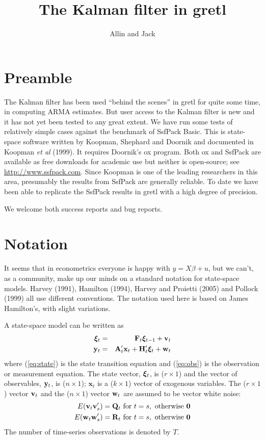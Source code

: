 \documentclass[a4paper]{article}
\title{The Kalman filter in gretl}
\author{Allin and Jack}
\newcommand{\obsvec}{\ensuremath\mathbf{y}}
\newcommand{\obsmat}{\ensuremath\mathbf{H}}
\newcommand{\obsx}{\ensuremath\mathbf{x}}
\newcommand{\obsxmat}{\ensuremath\mathbf{A}}
\newcommand{\obsdist}{\ensuremath\mathbf{w}}
\newcommand{\obsvar}{\ensuremath\mathbf{R}}
\newcommand{\statevec}{\ensuremath\mathbf{\bm \xi}}
\newcommand{\statemat}{\ensuremath\mathbf{F}}
\newcommand{\strdist}{\ensuremath\mathbf{v}}
\newcommand{\strvar}{\ensuremath\mathbf{Q}}
\begin{document}
\maketitle

\section{Preamble}
\label{sec:amble}

The Kalman filter has been used ``behind the scenes'' in gretl for
quite some time, in computing ARMA estimates.  But user access to the
Kalman filter is new and it has not yet been tested to any great
extent.  We have run some tests of relatively simple cases against the
benchmark of \textsf{SsfPack Basic}.  This is state-space software
written by Koopman, Shephard and Doornik and documented in Koopman
\textit{et al} (1999).  It requires Doornik's \textsf{ox} program.
Both \textsf{ox} and \textsf{SsfPack} are available as free downloads
for academic use but neither is open-source; see
\url{http://www.ssfpack.com}.  Since Koopman is one of the leading
researchers in this area, presumably the results from \textsf{SsfPack}
are generally reliable.  To date we have been able to replicate the
\textsf{SsfPack} results in gretl with a high degree of precision.

We welcome both success reports and bug reports.

\section{Notation}

It seems that in econometrics everyone is happy with $y = X \beta +
u$, but we can't, as a community, make up our minds on a standard
notation for state-space models. Harvey (1991), Hamilton (1994),
Harvey and Proietti (2005) and Pollock (1999) all use different
conventions. The notation used here is based on James Hamilton's, with
slight variations.

A state-space model can be written as
\begin{eqnarray}
  \label{eq:state}
  \statevec_{t} & = & \statemat_{t} \statevec_{t-1} + \strdist_t \\
  \label{eq:obs}
  \obsvec_t & = & \obsxmat_t'\obsx_t + \obsmat_t' \statevec_t + \obsdist_t
\end{eqnarray}
where (\ref{eq:state}) is the state transition equation and
(\ref{eq:obs}) is the observation or measurement equation.  The state
vector, $\statevec_{t}$, is ($r \times 1$) and the vector of
observables, $\obsvec_t$, is ($n \times 1$); $\mathbf{x}_t$ is a ($k
\times 1$) vector of exogenous variables.  The ($r \times 1$) vector
$\strdist_t$ and the ($n \times 1$) vector $\obsdist_t$ are assumed to
be vector white noise:
%
\begin{eqnarray*}
E(\strdist_t \strdist_s') = \strvar_t \mbox{ for } t = s, 
    \mbox{ otherwise } \mathbf{0} \\
E(\obsdist_t \obsdist_s') = \obsvar_t \mbox{ for } t = s, 
    \mbox{ otherwise } \mathbf{0}
\end{eqnarray*}
%
The number of time-series observations is denoted by $T$.
\end{document}
